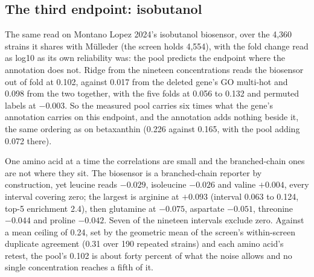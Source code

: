 


\subsection{The third endpoint: isobutanol}
\label{sec:isobutanol-cross}

The same read on Montano Lopez 2024's isobutanol biosensor, over the 4,360 strains it
shares with M\"ulleder (the screen holds 4,554), with the fold change read as log10 as
its own reliability was: the pool predicts the endpoint where the annotation does not.
Ridge from the nineteen concentrations reads the biosensor out of fold at 0.102, against
0.017 from the deleted gene's GO multi-hot and 0.098 from the two together, with the
five folds at 0.056 to 0.132 and permuted labels at $-0.003$. So the measured pool
carries six times what the gene's annotation carries on this endpoint, and the
annotation adds nothing beside it, the same ordering as on betaxanthin (0.226 against
0.165, with the pool adding 0.072 there).

One amino acid at a time the correlations are small and the branched-chain ones are not
where they sit. The biosensor is a branched-chain reporter by construction, yet leucine
reads $-0.029$, isoleucine $-0.026$ and valine $+0.004$, every interval covering zero;
the largest is arginine at $+0.093$ (interval 0.063 to 0.124, top-5 enrichment 2.4),
then glutamine at $-0.075$, aspartate $-0.051$, threonine $-0.044$ and proline
$-0.042$. Seven of the nineteen intervals exclude zero. Against a mean ceiling of 0.24,
set by the geometric mean of the screen's within-screen duplicate agreement (0.31 over
190 repeated strains) and each amino acid's retest, the pool's 0.102 is about forty
percent of what the noise allows and no single concentration reaches a fifth of it.

